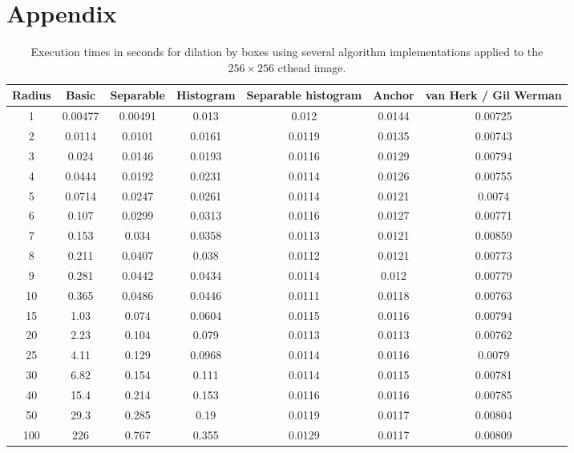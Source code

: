 \documentclass{InsightArticle}
\begin{document}


\nocite{ITKSoftwareGuide}

\appendix
\section*{Appendix}

\begin{table}[phtb]
\centering
\begin{tabular}{ccccccc}
\hline
Radius	&	Basic	&	Separable	&	Histogram	&	Separable histogram	&	Anchor	&	van Herk / Gil Werman	\\
\hline
1	&	0.00477	&	0.00491	&	0.013	&	0.012	&	0.0144	&	0.00725	\\
2	&	0.0114	&	0.0101	&	0.0161	&	0.0119	&	0.0135	&	0.00743	\\
3	&	0.024	&	0.0146	&	0.0193	&	0.0116	&	0.0129	&	0.00794	\\
4	&	0.0444	&	0.0192	&	0.0231	&	0.0114	&	0.0126	&	0.00755	\\
5	&	0.0714	&	0.0247	&	0.0261	&	0.0114	&	0.0121	&	0.0074	\\
6	&	0.107	&	0.0299	&	0.0313	&	0.0116	&	0.0127	&	0.00771	\\
7	&	0.153	&	0.034	&	0.0358	&	0.0113	&	0.0121	&	0.00859	\\
8	&	0.211	&	0.0407	&	0.038	&	0.0112	&	0.0121	&	0.00773	\\
9	&	0.281	&	0.0442	&	0.0434	&	0.0114	&	0.012	&	0.00779	\\
10	&	0.365	&	0.0486	&	0.0446	&	0.0111	&	0.0118	&	0.00763	\\
15	&	1.03	&	0.074	&	0.0604	&	0.0115	&	0.0116	&	0.00794	\\
20	&	2.23	&	0.104	&	0.079	&	0.0113	&	0.0113	&	0.00762	\\
25	&	4.11	&	0.129	&	0.0968	&	0.0114	&	0.0116	&	0.0079	\\
30	&	6.82	&	0.154	&	0.111	&	0.0114	&	0.0115	&	0.00781	\\
40	&	15.4	&	0.214	&	0.153	&	0.0116	&	0.0116	&	0.00785	\\
50	&	29.3	&	0.285	&	0.19	&	0.0119	&	0.0117	&	0.00804	\\
100	&	226	&	0.767	&	0.355	&	0.0129	&	0.0117	&	0.00809	\\
\hline
\hline
\end{tabular}
\caption{Execution times in seconds for dilation by boxes using several algorithm implementations applied to the $256 \times 256$ cthead image.\label{tab:perfDilation}}
\end{table}
\end{document}
